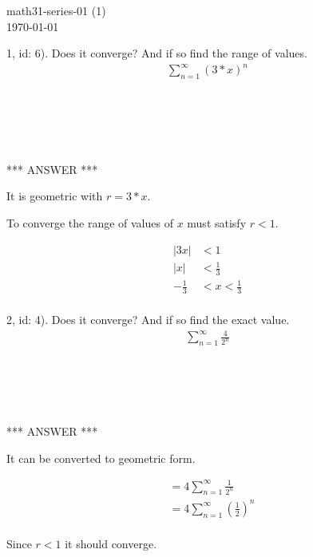 \documentclass[fleqn]{article}
\begin{document}
\begin{flushleft}
math31-series-01 (1)\\
\today
\end{flushleft}


1, id: 6).  Does it converge?  And if so find the range of values.\\

\begin{align*}
\sum_{n=1}^{\infty} \left(3*x\right)^n\\
\end{align*}


\begin{verbatim}





\end{verbatim}

*** ANSWER ***


It is geometric with $r = 3*x$.

To converge the range of values of $x$ must satisfy $r < 1$.

\begin{align*}
\left| 3x \right| &< 1\\
\left| x \right| &< \frac{1}{3}\\
-\frac{1}{3} &< x < \frac{1}{3}\\
\end{align*}


2, id: 4).  Does it converge?  And if so find the exact value.\\

\begin{align*}
\sum_{n=1}^{\infty} \frac{4}{2^n}
\end{align*}


\begin{verbatim}





\end{verbatim}

*** ANSWER ***


It can be converted to geometric form.

\begin{align*}
&= 4 \sum_{n=1}^{\infty} \frac{1}{2^n}\\
&= 4 \sum_{n=1}^{\infty} \left(\frac{1}{2}\right)^n\\
\end{align*}

Since $r < 1$ it should converge.
\end{document}
